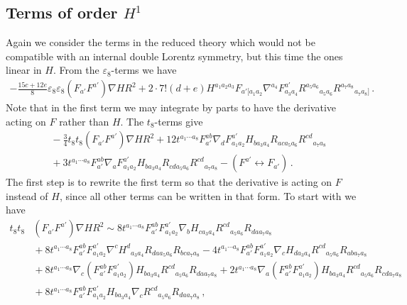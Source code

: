 \documentclass[a4paper,11pt]{article}
\begin{document}

\subsection{Terms of order \texorpdfstring{$H^1$}{H**1}}
Again we consider the terms in the reduced theory which would not be compatible with an internal double Lorentz symmetry, but this time the ones linear in $H$. From the $\varepsilon_8$-terms we have
\begin{align}
-\frac{15c+12e}{8}\varepsilon_8\varepsilon_8(F_{a'}F^{a'})\nabla HR^2
+2\cdot7!(d+e)H^{a_1a_2a_3}F_{a'[a_1a_2}\nabla^{a_4}F^{a'}_{a_3a_4}R^{a_5a_6}{}_{a_5a_6}R^{a_7a_8}{}_{a_7a_8]}\,.
\label{eq:e8e8H1}
\end{align}
Note that in the first term we may integrate by parts to have the derivative acting on $F$ rather than $H$. The $t_8$-terms give
\begin{align}
&{}-\frac{3}{4}t_8t_8(F_{a'}F^{a'})\nabla HR^2
+12t^{a_1\cdots a_8}F_{a'}^{ab}\nabla_dF^{a'}_{a_1a_2}H_{ba_3a_4}R_{aca_5a_6}R^{cd}{}_{a_7a_8}
\nonumber\\
&{}+3t^{a_1\cdots a_8}F_{a'}^{ab}\nabla_aF^{a'}_{a_1a_2}H_{ba_3a_4}R_{cda_5a_6}R^{cd}{}_{a_7a_8}
-(F^{a'}\leftrightarrow F_{a'})\,.
\label{eq:t8H1}
\end{align}
The first step is to rewrite the first term so that the derivative is acting on $F$ instead of $H$, since all other terms can be written in that form. To start with we have
\begin{align}
t_8t_8&(F_{a'}F^{a'})\nabla HR^2
\sim
8t^{a_1\cdots a_8}F_{a'}^{ab}F^{a'}_{a_1a_2}\nabla_bH_{ca_3a_4}R^{cd}{}_{a_5a_6}R_{daa_7a_8}
\nonumber\\
&{}
+8t^{a_1\cdots a_8}F_{a'}^{ab}F^{a'}_{a_1a_2}\nabla^cH^d{}_{a_3a_4}R_{daa_5a_6}R_{bca_7a_8}
-4t^{a_1\cdots a_8}F_{a'}^{ab}F^{a'}_{a_1a_2}\nabla_cH_{da_3a_4}R^{cd}{}_{a_5a_6}R_{aba_7a_8}
\nonumber\\
&{}
+8t^{a_1\cdots a_8}\nabla_c(F_{a'}^{ab}F^{a'}_{a_1a_2})H_{ba_3a_4}R^{cd}{}_{a_5a_6}R_{daa_7a_8}
+2t^{a_1\cdots a_8}\nabla_a(F_{a'}^{ab}F^{a'}_{a_1a_2})H_{ba_3a_4}R^{cd}{}_{a_5a_6}R_{cda_7a_8}
\nonumber\\
&{}
+8t^{a_1\cdots a_8}F_{a'}^{ab}F^{a'}_{a_1a_2}H_{ba_3a_4}\nabla_cR^{cd}{}_{a_5a_6}R_{daa_7a_8}\,,
\label{eq:H1-1}
\end{align}
\end{document}
